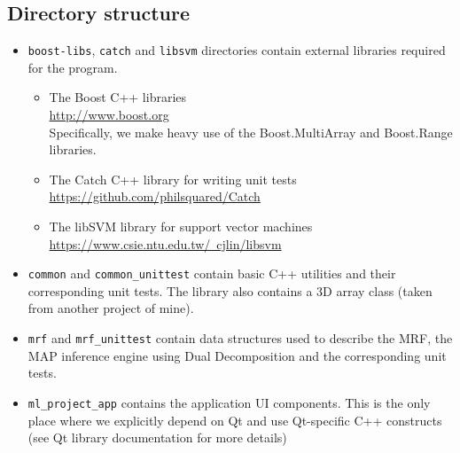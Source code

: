 \documentclass[12pt,a4paper]{article}
\begin{document}
\subsection{Directory structure}
\begin{itemize}
	\item \texttt{boost-libs}, \texttt{catch} and \texttt{libsvm} directories contain external libraries required for the program.
	\begin{itemize}
		\item The Boost C++ libraries \\
		      \href{http://www.boost.org}{http://www.boost.org} \\
		      Specifically, we make heavy use of the Boost.MultiArray and Boost.Range libraries.
		\item The Catch C++ library for writing unit tests \\
		      \href{https://github.com/philsquared/Catch}{https://github.com/philsquared/Catch}
		\item The libSVM library for support vector machines \\
		      \href{https://www.csie.ntu.edu.tw/~cjlin/libsvm}{https://www.csie.ntu.edu.tw/~cjlin/libsvm}
	\end{itemize}
	\item \texttt{common} and \texttt{common\_unittest} contain basic C++ utilities and their corresponding unit tests. The library also contains a 3D array class (taken from another project of mine).
	\item \texttt{mrf} and \texttt{mrf\_unittest} contain data structures used to describe the MRF, the MAP inference engine using Dual Decomposition and the corresponding unit tests.
	\item \texttt{ml\_project\_app} contains the application UI components. This is the only place where we explicitly depend on Qt and use Qt-specific C++ constructs (see Qt library documentation for more details)
\end{itemize}
\end{document}
